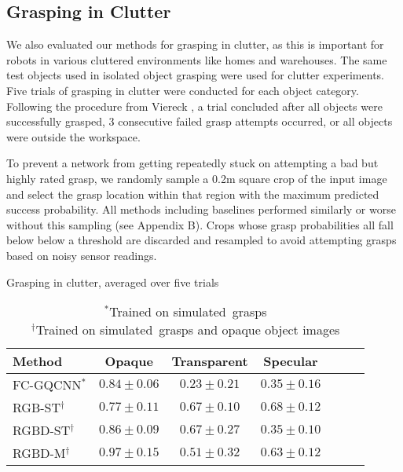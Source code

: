 \subsection{Grasping in Clutter}

We also evaluated our methods for grasping in clutter, as this is important for robots in various cluttered environments like homes and warehouses.   
The same test objects used in isolated object grasping were used for clutter experiments. 
Five trials of grasping in clutter were conducted for each object category. 
Following the procedure from Viereck \etal\cite{viereck2017learning}, a trial concluded after all objects were successfully grasped, 3 consecutive failed grasp attempts occurred, or all objects were outside the workspace.

To prevent a network from getting repeatedly stuck on attempting a bad but highly rated grasp, we randomly sample a 0.2m square crop of the input image and select the grasp location within that region with the maximum predicted success probability.
All methods including baselines performed similarly or worse without this sampling (see Appendix B).
Crops whose grasp probabilities all fall below below a threshold are discarded and resampled to avoid attempting grasps based on noisy sensor readings. 

\begin{table}[h]
    \centering
    \caption{Grasping in clutter, averaged over five trials}
    \label{table:clutter_eval}
    \begin{tabular}{l cc cc cc}
      \toprule
        Method 
            & Opaque
            & Transparent
            & Specular \\
        \midrule
        FC-GQCNN$^*$
            & $0.84\pm0.06$
            & $0.23\pm0.21$
            & $0.35\pm0.16$ \\
        RGB-ST$^\dagger$
            & $0.77\pm0.11$
            & $\mathbf{0.67\pm0.10}$
            & $\mathbf{0.68\pm0.12}$ \\
        RGBD-ST$^\dagger$
            & $0.86\pm0.09$
            & $0.67\pm0.27$
            & $0.35\pm0.10$ \\
        RGBD-M$^\dagger$ 
            & $\mathbf{0.97\pm0.15}$
            & $0.51\pm0.32$
            & $0.63\pm0.12$ \\
      \bottomrule
    \end{tabular}
    \vspace{3pt}
    \caption*{\footnotesize $^*$Trained on simulated\ grasps \\ $^\dagger$Trained on simulated\ grasps and opaque object images \\}
    \vspace{-2em}
\end{table}

